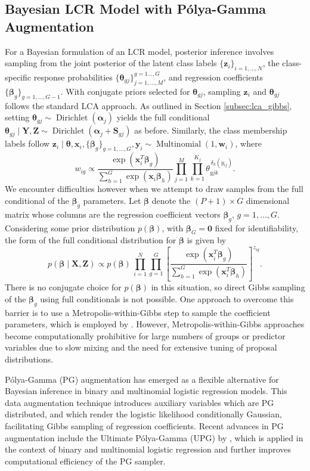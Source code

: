 \documentclass[11pt]{article}
\def\Mult{\operatorname{Multinomial}}
\def\Dir{\operatorname{Dirichlet}}
\def\boldw{\mathbf{w}}
\def\boldx{\mathbf{x}}
\def\boldy{\mathbf{y}}
\def\boldz{\mathbf{z}}
\def\boldS{\mathbf{S}}
\def\boldX{\mathbf{X}}
\def\boldY{\mathbf{Y}}
\def\boldZ{\mathbf{Z}}
\def\bsal{\boldsymbol{\alpha}}
\def\bsbet{\boldsymbol{\beta}}
\def\bsthet{\boldsymbol{\theta}}
\theoremstyle{plain}
\theoremstyle{definition}
\begin{document}
\subsection{Bayesian LCR Model with Pólya-Gamma Augmentation}
For a Bayesian formulation of an LCR model, posterior inference involves sampling from the joint posterior of the latent class labels $\{\boldz_i\}_{i=1,\dots,N}$, the class-specific response probabilities $\{\bsthet_{gj}\}_{j=1,\dots,M}^{g=1\dots,G}$, and regression coefficients $\{\bsbet_g\}_{g = 1,\dots,G-1}$. With conjugate priors selected for $\bsthet_{gj}$, sampling $\boldz_{i}$ and $\bsthet_{gj}$ follows the standard LCA approach. As outlined in Section \ref{subsec:lca_gibbs}, setting $\bsthet_{gj} \sim \Dir(\bsal_j)$ yields the full conditional $\bsthet_{gj} \mid \boldY, \boldZ \sim \Dir(\bsal_j + \boldS_{gj})$ as before. Similarly, the class membership labels follow $\boldz_i \mid \bsthet, \boldx_i, \{\bsbet_{g}\}_{g=1,\dots,G}, \boldy_i \sim \Mult(1,\boldw_i)$, where 
\[
w_{ig} \propto \frac{\exp\left( \boldx_i^T \bsbet_g \right)}{\sum_{h=1}^G \exp\left( \boldx_i \bsbet_h \right)} \prod_{j=1}^M \prod_{k=1}^{K_j} \theta_{gjk}^{\,\delta_k(y_{ij})} .%
\]
We encounter difficulties however when we attempt to draw samples from the full conditional of the $\bsbet_g$ parameters. Let $\bsbet$ denote the $(P+1)\times G$ dimensional matrix whose columns are the regression coefficient vectors $\bsbet_g$, $g = 1,\dots, G$.
Considering some prior distribution $p(\bsbet)$, with $\bsbet_G = \mathbf{0}$ fixed for identifiability, the form of the full conditional distribution for $\bsbet$ is given by
\begin{equation}\label{beta_fc1}
p(\bsbet \mid \boldX, \boldZ) \propto p(\bsbet)\, \prod_{i=1}^N \prod_{g=1}^G \left[ \frac{\exp(\boldx_i^T\bsbet_g)}{\sum_{h=1}^G\exp(\boldx_i^T\bsbet_h)} \right]^{z_{ig}}.
\end{equation}
There is no conjugate choice for $p(\bsbet)$ in this situation, so direct Gibbs sampling of the $\bsbet_g$ using full conditionals is not possible. One approach to overcome this barrier is to use a Metropolis-within-Gibbs step to sample the coefficient parameters, which is employed by \citet{chung_latent_2006}. However, Metropolis-within-Gibbs approaches become computationally prohibitive for large numbers of groups or predictor variables due to slow mixing and the need for extensive tuning of proposal distributions.

Pólya-Gamma (PG) augmentation \citet{polson_bayesian_2013} has emerged as a flexible alternative for Bayesian inference in binary and multinomial logistic regression models. This data augmentation technique introduces auxiliary variables which are PG distributed, and which render the logistic likelihood conditionally Gaussian, facilitating Gibbs sampling of regression coefficients. Recent advances in PG augmentation include the Ultimate Pólya-Gamma (UPG) by \citet{zens_ultimate_2024}, which is applied in the context of binary and multinomial logistic regression and further improves computational efficiency of the PG sampler. 
\end{document}
